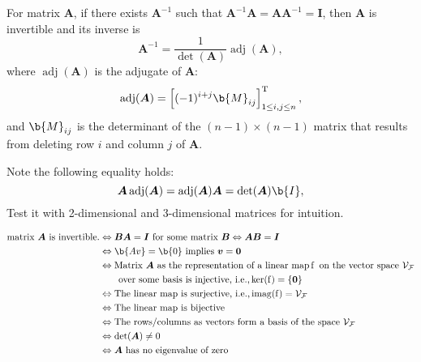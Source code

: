 \begin{definition}
For matrix $\bm A$, if there exists $\bm A^{-1}$ such that $\bm A^{-1} \bm A = \bm A \bm A^{-1} = \bm I$, then $\bm A$ is invertible and its inverse is
%
\begin{equation*}
    \bm A^{-1}  =  \frac{1}{\det(\bm A)} \operatorname {adj}(\bm A),
\end{equation*}
%
where $\operatorname {adj}(\bm A)$ is the adjugate of $\bm A$: 
$$\operatorname {adj}(\bm A) = \left[ (-1)^{i+j} \b{M}_{ij} \right]_{1\leq i,j\leq n}^\T,$$
and $\b{M}_{ij}$ is the determinant of the $(n-1) \times (n-1)$ matrix that results from deleting row $i$ and column $j$ of $\bm A$.
\end{definition}

\begin{remark}
Note the following equality holds:
%
\begin{equation*}
    \bm A \operatorname {adj}(\bm A) =   \operatorname {adj}(\bm A) \bm A = \det(\bm A) \b{I},
\end{equation*}
%
Test it with 2-dimensional and 3-dimensional matrices for intuition.
\end{remark}



\begin{theorem}
    \begin{align*}
        \textnormal{matrix } \bm A \textnormal{ is invertible.}
        &\Leftrightarrow \bm B \bm A = \bm I \textnormal{ for some matrix } \bm B 
        \Leftrightarrow   \bm A \bm B = \bm I\\
        &\Leftrightarrow \b{Av} = \b{0} \textnormal{ implies } \bm v = \bm 0 \\
        &\Leftrightarrow \textnormal{Matrix } \bm A \textnormal{ as the representation of a linear map} \f \textnormal{ on the vector space } \VF  \\ 
        & \qquad \textnormal{over some basis is injective, i.e.,} \operatorname{ker}(\f) = \{ \bm 0 \}  \\
        &\Leftrightarrow \textnormal{The linear map is surjective, i.e.,} \operatorname{imag}(\f) = \VF \\
        &\Leftrightarrow \textnormal{The linear map is bijective} \\
        &\Leftrightarrow \textnormal{The rows/columns as vectors form a basis of the space } \VF \\
        &\Leftrightarrow \det(\bm A) \neq 0 \\
        &\Leftrightarrow \bm A \textnormal{ has no eigenvalue of zero} 
    \end{align*}
\end{theorem}


